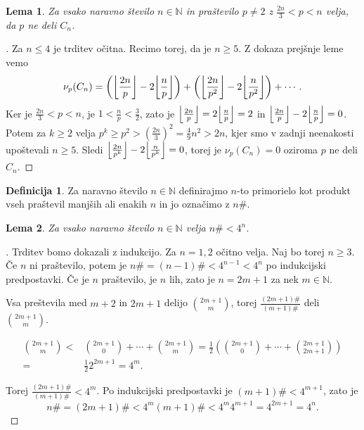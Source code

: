 \documentclass[a4paper,12pt]{article}
\def\N{\mathbb{N}}
\theoremstyle{definition}
\newtheorem{definicija}{Definicija}
\theoremstyle{plain}
\newtheorem{lema}{Lema}
\newenvironment{dokaz}{\begin{proof}[\bfseries\upshape\proofname]}{\end{proof}}
\DeclarePairedDelimiter\floor{\lfloor}{\rfloor}
\begin{document}
\begin{lema}
    \label{lema3}
    Za vsako naravno število $n \in \N$ in praštevilo $p \neq 2$ z $\frac{2n}{3} < p < n$ velja, da $p$ ne deli $C_n$. 
\end{lema}
\begin{dokaz}
    Za $n \leq 4$ je trditev očitna. Recimo torej, da je $n \geq 5$. Z dokaza prejšnje leme vemo $$\nu_p(C_n) = \left( \floor*{\frac{2n}{p}} - 2\floor*{\frac{n}{p}} \right) + \left( \floor*{\frac{2n}{p^2}} - 2\floor*{\frac{n}{p^2}} \right) + \cdots.$$ Ker je $\frac{2n}{3} < p < n$, je $1 < \frac{n}{p} < \frac{3}{2}$, zato je $\floor*{\frac{2n}{p}} = 2\floor*{\frac{n}{p}} = 2$ in $\floor*{\frac{2n}{p}} - 2\floor*{\frac{n}{p}} = 0$. Potem za $k \geq 2$ velja $p^k \geq p^2 > (\frac{2n}{3})^2 = \frac{4}{9}n^2 > 2n$, kjer smo v zadnji neenakosti upoštevali $n \geq 5$. Sledi $\floor*{\frac{2n}{p^k}} - 2\floor*{\frac{n}{p^k}} = 0$, torej je $\nu_p(C_n) = 0$ oziroma $p$ ne deli $C_n$.
\end{dokaz}

\begin{definicija}
    Za naravno število $n \in \N$ definirajmo $n$-to primorielo kot produkt vseh praštevil manjših ali enakih $n$ in jo označimo z $n\#$.
\end{definicija}

\begin{lema}
    \label{lema4}
    Za vsako naravno število $n \in \N$ velja $n\# < 4^n$. 
\end{lema}
\begin{dokaz}
    Trditev bomo dokazali z indukcijo. Za $n = 1, 2$ očitno velja. Naj bo torej $n \geq 3$. Če $n$ ni praštevilo, potem je $n\# = (n - 1)\# < 4^{n - 1} < 4^n$ po indukcijski predpostavki. Če je $n$ praštevilo, je $n$ lih, zato je $n = 2m + 1$ za nek $m \in \N$.
    
    Vsa preštevila med $m + 2$ in $2m + 1$ delijo $\binom{2m + 1}{m}$, torej $\frac{(2m + 1)\#}{(m + 1)\#}$ deli $\binom{2m + 1}{m}$.

    \begin{align*}
        \binom{2m + 1}{m} <& \binom{2m + 1}{0} + \cdots + \binom{2m + 1}{m} = \frac{1}{2} \left( \binom{2m + 1}{0} + \cdots + \binom{2m + 1}{2m + 1} \right)\\ =& \frac{1}{2} 2^{2m + 1} = 4^m.
    \end{align*}

    Torej $\frac{(2m + 1)\#}{(m + 1)\#} < 4^m$. Po indukcijski predpostavki je $(m + 1)\# < 4^{m + 1}$, zato je $$n\# = (2m + 1)\# < 4^m (m + 1)\# < 4^m 4^{m + 1} = 4^{2m + 1} = 4^n.$$
\end{dokaz}
\end{document}
